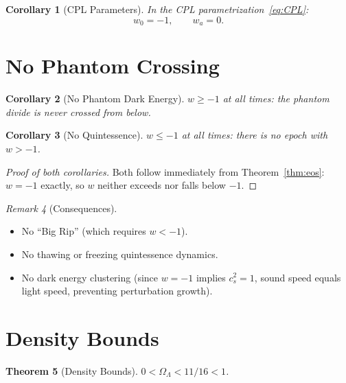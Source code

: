 \documentclass[12pt,a4paper]{article}
\newtheorem{theorem}{Theorem}[section]
\newtheorem{corollary}[theorem]{Corollary}
\theoremstyle{definition}
\theoremstyle{remark}
\newtheorem{remark}[theorem]{Remark}
\begin{document}
\begin{corollary}[CPL Parameters]
In the CPL parametrization~\eqref{eq:CPL}:
\begin{equation}
  \boxed{w_0 = -1, \qquad w_a = 0.}
\end{equation}
\end{corollary}

\section{No Phantom Crossing}
\label{sec:phantom}

\begin{corollary}[No Phantom Dark Energy]
\label{thm:no-phantom}
$w \geq -1$ at all times: the phantom divide is never crossed from below.
\end{corollary}

\begin{corollary}[No Quintessence]
\label{thm:no-quint}
$w \leq -1$ at all times: there is no epoch with $w > -1$.
\end{corollary}

\begin{proof}[Proof of both corollaries]
Both follow immediately from Theorem~\ref{thm:eos}: $w = -1$ exactly,
so $w$ neither exceeds nor falls below $-1$.
\end{proof}

\begin{remark}[Consequences]
\begin{itemize}
  \item No ``Big Rip'' (which requires $w < -1$).
  \item No thawing or freezing quintessence dynamics.
  \item No dark energy clustering (since $w = -1$ implies
  $c_s^2 = 1$, sound speed equals light speed, preventing
  perturbation growth).
\end{itemize}
\end{remark}

\section{Density Bounds}
\label{sec:bounds}

\begin{theorem}[Density Bounds]
\label{thm:bounds}
$0 < \Omega_\Lambda < 11/16 < 1$.
\end{theorem}
\end{document}
